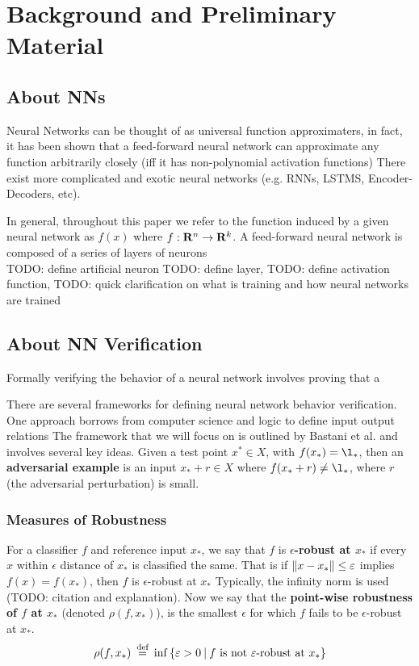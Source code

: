 \chapter{Background and Preliminary Material}

\section{About NNs}
Neural Networks can be thought of as universal function approximaters,
in fact, it has been shown that a feed-forward neural network can approximate any 
function arbitrarily closely (iff it has non-polynomial activation functions)
There exist more complicated and exotic neural networks (e.g. RNNs, LSTMS, Encoder-Decoders, etc).

In general, throughout this paper we refer to the function induced by a given neural network
as $f(x)$ where $f:\mathbf{R}^n \to \mathbf{R}^k$.
A feed-forward neural network is composed of a series of layers of neurons \\

TODO: define artificial neuron
TODO: define layer,
TODO: define activation function,
TODO: quick clarification on what is training and how neural networks are trained \\

\section{About NN Verification}
Formally verifying the behavior of a neural network involves
proving that a 

There are several frameworks for defining neural network behavior verification.
One approach borrows from computer science and logic to define input output relations
The framework that we will focus on is outlined by
Bastani et al. and involves several key ideas.
Given a test point $x^* \in X$, with $f(x_*) = \l_*$,
then an
{\bf adversarial example}
is an input
$x_* + r \in X$ where $f(x_* + r) \neq \l_*$,
where $r$ (the adversarial perturbation) is small.

\subsection{Measures of Robustness}

For a classifier $f$ and reference input $x_*$, we say that $f$ is
{\bf $\epsilon$-robust at $x_*$}
if every $x$ within $\epsilon$ distance of $x_*$ is classified the same.
That is if $\lVert x - x_*\rVert \leq \varepsilon$ implies $f(x) = f(x_*)$,
then $f$ is $\epsilon$-robust at $x_*$
Typically, the infinity norm is used (TODO: citation and explanation).
Now we say that the
{\bf point-wise robustness of $f$ at $x_*$}
(denoted $\rho(f, x_*)$),
is the smallest $\epsilon$ for which $f$ fails to be $\epsilon$-robust at $x_*$.
\begin{equation}{}
  \rho(f, x_*)
  \medspace
  \stackrel{\text{def}}{=}
  \medspace
  \inf
  \left\{
    \varepsilon > 0 \medspace | \medspace f
    \text{ is not }
    \varepsilon\text{-robust at } x_*
  \right\}
\end{equation}

